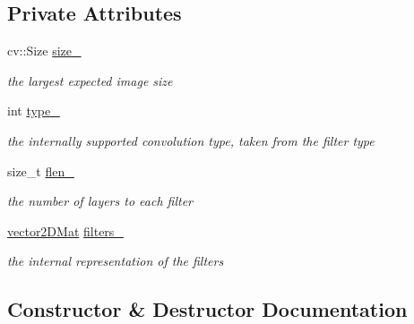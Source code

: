 \subsection*{Private Attributes}
\begin{DoxyCompactItemize}
\item 
cv\+::\+Size \hyperlink{classFourierConvolutionEngine_a2375ea1729ad2fe45fe6204130f3f39f}{size\+\_\+}
\begin{DoxyCompactList}\small\item\em the largest expected image size \end{DoxyCompactList}\item 
int \hyperlink{classFourierConvolutionEngine_a3e213d98d690b295eaa2866618f17933}{type\+\_\+}
\begin{DoxyCompactList}\small\item\em the internally supported convolution type, taken from the filter type \end{DoxyCompactList}\item 
size\+\_\+t \hyperlink{classFourierConvolutionEngine_ab4322f51ce4a18ab5b7439abb5c96aef}{flen\+\_\+}
\begin{DoxyCompactList}\small\item\em the number of layers to each filter \end{DoxyCompactList}\item 
\hyperlink{types_8hpp_a33cacb85be7b8df3dc0b67d5d849f4cc}{vector2\+D\+Mat} \hyperlink{classFourierConvolutionEngine_ac6cf3c6a66e99bec7d8135f8069d79e3}{filters\+\_\+}
\begin{DoxyCompactList}\small\item\em the internal representation of the filters \end{DoxyCompactList}\end{DoxyCompactItemize}


\subsection{Constructor \& Destructor Documentation}
\hypertarget{classFourierConvolutionEngine_a30d60a44b5767b43a4042171cf813fcd}{}
